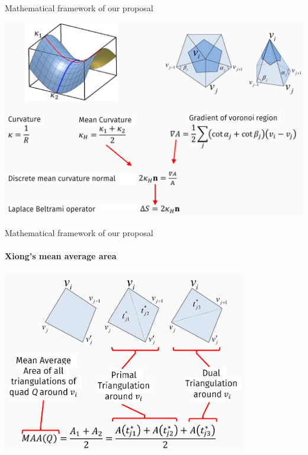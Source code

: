 \documentclass[10pt, compress, english]{beamer}
\begin{document}
\begin{frame}{Mathematical framework of our proposal}

 
\begin{center}
\includegraphics[width=1\textwidth]{img/proposal_kurvature}
\par\end{center}

\end{frame} 

\begin{frame}{Mathematical framework of our proposal}


\framesubtitle{Xiong's mean average area}


\begin{center}
\includegraphics[width=0.8\textwidth]{img/proposal_maa}
\par\end{center}

\end{frame}
\end{document}
